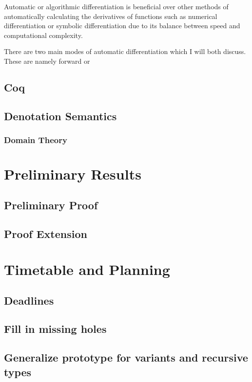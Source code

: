 \documentclass[11pt, letterpaper]{article}
\begin{document}
Automatic or algorithmic differentiation is beneficial over other methods of automatically calculating the derivatives of functions such as numerical differentiation or symbolic differentiation due to its balance between speed and computational complexity.

There are two main modes of automatic differentiation which I will both discuss. These are namely forward or

\subsection{Coq}

\subsection{Denotation Semantics}

\subsubsection{Domain Theory}

\section{Preliminary Results}

\subsection{Preliminary Proof}

\subsection{Proof Extension}

\section{Timetable and Planning}

\subsection{Deadlines}
\subsection{Fill in missing holes}
\subsection{Generalize prototype for variants and recursive types}

\printbibliography
\end{document}
